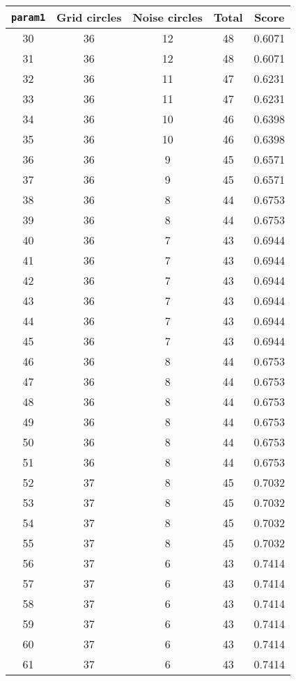 \documentclass[letterpaper, 12pt]{article}
\begin{document}
\begin{longtable}{|c|c|c|c|c|}
\hline
\textbf{\texttt{param1}} & \textbf{Grid circles} & \textbf{Noise circles} & \textbf{Total} & \textbf{Score} \\
\hline
30 & 36 & 12 & 48 & 0.6071 \\
\hline
31 & 36 & 12 & 48 & 0.6071 \\
\hline
32 & 36 & 11 & 47 & 0.6231 \\
\hline
33 & 36 & 11 & 47 & 0.6231 \\
\hline
34 & 36 & 10 & 46 & 0.6398 \\
\hline
35 & 36 & 10 & 46 & 0.6398 \\
\hline
36 & 36 & 9 & 45 & 0.6571 \\
\hline
37 & 36 & 9 & 45 & 0.6571 \\
\hline
38 & 36 & 8 & 44 & 0.6753 \\
\hline
39 & 36 & 8 & 44 & 0.6753 \\
\hline
40 & 36 & 7 & 43 & 0.6944 \\
\hline
41 & 36 & 7 & 43 & 0.6944 \\
\hline
42 & 36 & 7 & 43 & 0.6944 \\
\hline
43 & 36 & 7 & 43 & 0.6944 \\
\hline
44 & 36 & 7 & 43 & 0.6944 \\
\hline
45 & 36 & 7 & 43 & 0.6944 \\
\hline
46 & 36 & 8 & 44 & 0.6753 \\
\hline
47 & 36 & 8 & 44 & 0.6753 \\
\hline
48 & 36 & 8 & 44 & 0.6753 \\
\hline
49 & 36 & 8 & 44 & 0.6753 \\
\hline
50 & 36 & 8 & 44 & 0.6753 \\
\hline
51 & 36 & 8 & 44 & 0.6753 \\
\hline
52 & 37 & 8 & 45 & 0.7032 \\
\hline
53 & 37 & 8 & 45 & 0.7032 \\
\hline
54 & 37 & 8 & 45 & 0.7032 \\
\hline
55 & 37 & 8 & 45 & 0.7032 \\
\hline
56 & 37 & 6 & 43 & 0.7414 \\
\hline
57 & 37 & 6 & 43 & 0.7414 \\
\hline
58 & 37 & 6 & 43 & 0.7414 \\
\hline
59 & 37 & 6 & 43 & 0.7414 \\
\hline
60 & 37 & 6 & 43 & 0.7414 \\
\hline
61 & 37 & 6 & 43 & 0.7414 \\

\end{longtable}
\end{document}

